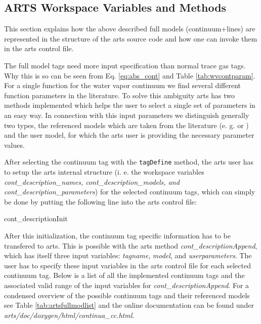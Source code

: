 \subsection{ARTS Workspace Variables and Methods}
\label{levelc:ArtsImplementationCompleteModels}

This section explains how the above described full models (continuum+lines) 
are represented in the structure of the arts source code and how 
one can invoke them in the arts control file.

The full model tags need more input specification than normal trace gas
tags. Why this is so can be seen from Eq. \ref{eq:abs_cont} and 
Table \ref{tab:wvcontparam}. For a single function for the water vapor 
continuum we find several different function parameters in the literature. 
To solve this ambiguity arts has two methods implemented which helps 
the user to select a single set of parameters in an easy way. 
In connection with this input parameters we distinguish generally two 
types, the referenced models which are taken from the literature 
(e. g. \citet{liebeetal:93} or \citet{pwr:93}) and the user model, 
for which the arts user is providing the necessary parameter values.

After selecting the continuum tag with the {\tt tagDefine} method, 
the arts user has to setup the arts internal structure (i. e. the workspace 
variables {\it cont\_description\_names, cont\_description\_models, 
and cont\_description\_parameters}) for the selected continuum tags, 
which can simply be done by putting the following line into the arts control file:
\begin{code}
cont_descriptionInit{}
\end{code}

After this initialization, the continuum tag specific
information has to be transfered to arts. This is possible with the 
arts method {\it cont\_descriptionAppend}, which has itself 
three input variables: {\it tagname}, {\it model}, and 
{\it userparameters}. The user has to specify these input 
variables in the arts control file for each selected continuum tag. 
Below is a list of all the implemented continuum tags and the associated
valid range of the input variables for {\it cont\_descriptionAppend}. 
For a condensed overview of the possible continuum tags and their 
referenced models see Table \ref{tab:artsfullmodlist} and the 
online documentation can be found under 
{\it arts/doc/doxygen/html/continua\_cc.html}.

